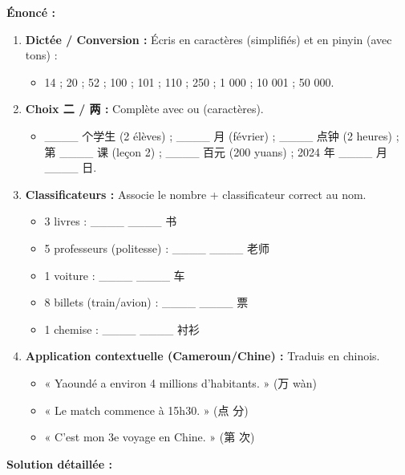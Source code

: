 \documentclass[11pt]{article}
\newcommand{\cle}[1]{{\popxbold\color{popdark}#1}}
\newcommand{\zh}[1]{\ifmmode\text{#1}\else{#1}\fi}
\begin{document}
\begin{exoresolu}
\textbf{Énoncé :}
\begin{enumerate}
    \item \textbf{Dictée / Conversion :} Écris en caractères (simplifiés) et en pinyin (avec tons) :
    \begin{itemize}
        \item 14 ; 20 ; 52 ; 100 ; 101 ; 110 ; 250 ; 1 000 ; 10 001 ; 50 000.
    \end{itemize}
    \item \textbf{Choix \cle{二} / \cle{两} :} Complète avec \zh{二} ou \zh{两} (caractères).
    \begin{itemize}
        \item \_\_\_\_ 个学生 (2 élèves) ; \_\_\_\_ 月 (février) ; \_\_\_\_ 点钟 (2 heures) ; 第 \_\_\_\_ 课 (leçon 2) ; \_\_\_\_ 百元 (200 yuans) ; 2024 年 \_\_\_\_ 月 \_\_\_\_ 日.
    \end{itemize}
    \item \textbf{Classificateurs :} Associe le nombre + classificateur correct au nom.
    \begin{itemize}
        \item 3 livres : \_\_\_\_ \_\_\_\_ 书
        \item 5 professeurs (politesse) : \_\_\_\_ \_\_\_\_ 老师
        \item 1 voiture : \_\_\_\_ \_\_\_\_ 车
        \item 8 billets (train/avion) : \_\_\_\_ \_\_\_\_ 票
        \item 1 chemise : \_\_\_\_ \_\_\_\_ 衬衫
    \end{itemize}
    \item \textbf{Application contextuelle (Cameroun/Chine) :} Traduis en chinois.
    \begin{itemize}
        \item « Yaoundé a environ 4 millions d'habitants. » (万 wàn)
        \item « Le match commence à 15h30. » (点 分)
        \item « C'est mon 3e voyage en Chine. » (第 次)
    \end{itemize}
\end{enumerate}

\tcblower

\textbf{Solution détaillée :}


\end{exoresolu}
\end{document}
